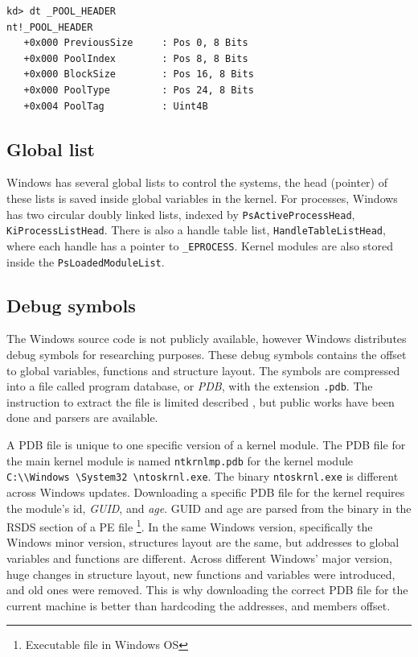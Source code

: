 \begin{lstlisting}[language=windbg,caption=\texttt{\_POOL\_HEADER} in Windows 64-bit,float,floatplacement=H]
kd> dt _POOL_HEADER
nt!_POOL_HEADER
   +0x000 PreviousSize     : Pos 0, 8 Bits
   +0x000 PoolIndex        : Pos 8, 8 Bits
   +0x000 BlockSize        : Pos 16, 8 Bits
   +0x000 PoolType         : Pos 24, 8 Bits
   +0x004 PoolTag          : Uint4B
\end{lstlisting}

\subsection[Global list]{Global list}

Windows has several global lists to control the systems, the head (pointer) of
these lists is saved inside global variables in the kernel. For processes,
Windows has two circular doubly linked lists, indexed by
\texttt{PsActiveProcessHead}, \texttt{KiProcessListHead}.  There is also a
handle table list, \texttt{HandleTableListHead}, where each handle has a
pointer to \texttt{\_EPROCESS}. Kernel modules are also stored inside the
\texttt{PsLoadedModuleList}.

\subsection[Debug symbols]{Debug symbols}

The Windows source code is not publicly available, however Windows distributes
debug symbols for researching purposes. These debug symbols contains the offset
to global variables, functions and structure layout. The symbols are compressed
into a file called program database, or \textit{PDB}, with the extension
\texttt{.pdb}. The instruction to extract the file is limited described
\cite{microsoft-pdb}, but public works have been done and parsers are
available.

A PDB file is unique to one specific version of a kernel module. The PDB file
for the main kernel module is named \texttt{ntkrnlmp.pdb} for the kernel module
\texttt{C:\textbackslash \textbackslash Windows \textbackslash System32
\textbackslash ntoskrnl.exe}. The binary \texttt{ntoskrnl.exe} is different
across Windows updates. Downloading a specific PDB file for the kernel requires
the module's id, \textit{GUID}, and \textit{age}. GUID and age are parsed from
the binary in the RSDS section of a PE file \footnote{Executable file in
Windows OS}. In the same Windows version, specifically the Windows minor
version, structures layout are the same, but addresses to global variables and
functions are different.  Across different Windows' major version, huge changes
in structure layout, new functions and variables were introduced, and old ones
were removed. This is why downloading the correct PDB file for the current
machine is better than hardcoding the addresses, and members offset.

